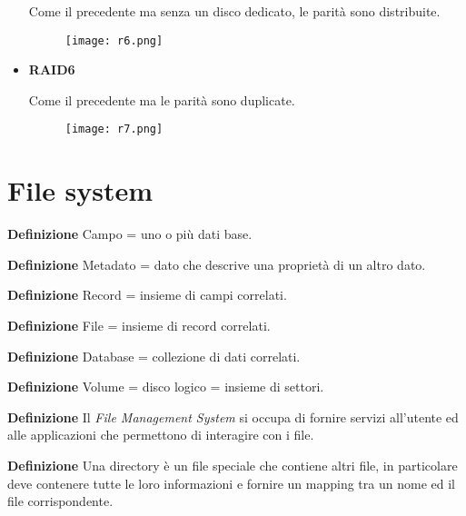 \documentclass{article}
\begin{document}
\begin{itemize}
        Come il precedente ma senza un disco dedicato, le parità sono distribuite.

        \begin{figure}[ht]
            \centering
            \texttt{[image: r6.png]}
            \label{fig:raid5}
        \end{figure}

    \item \textbf{RAID6}

        Come il precedente ma le parità sono duplicate.\newline

        \begin{figure}[ht]
            \centering
            \texttt{[image: r7.png]}
            \label{fig:raid6}
        \end{figure}
    
\end{itemize}

\newpage

\section{File system}

\textbf{Definizione} Campo = uno o più dati base.\newline

\noindent\textbf{Definizione} Metadato = dato che descrive una proprietà di un altro dato.\newline

\noindent\textbf{Definizione} Record = insieme di campi correlati.\newline

\noindent\textbf{Definizione} File = insieme di record correlati.\newline

\noindent\textbf{Definizione} Database = collezione di dati correlati.\newline

\noindent\textbf{Definizione} Volume = disco logico = insieme di settori.\newline

\noindent\textbf{Definizione} Il \textit{File Management System} si occupa di fornire servizi all'utente ed alle applicazioni che permettono di interagire con i file.\newline

\noindent\textbf{Definizione} Una directory è un file speciale che contiene altri file, in particolare deve contenere tutte le loro informazioni e fornire un mapping tra un nome ed il file corrispondente.\newline
\end{document}
